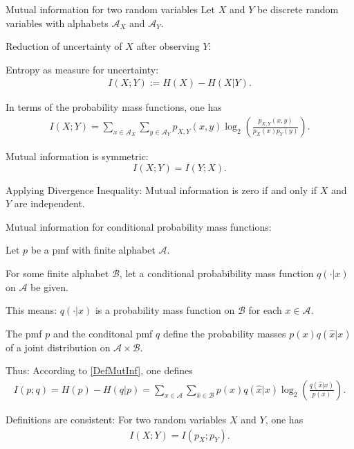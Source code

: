 \begin{frame}{Mutual information for two random variables}
Let $X$ and $Y$ be discrete random variables with alphabets $\mathcal{A}_X$ and $\mathcal{A}_Y$.

\bit
\item Reduction of uncertainty of $X$ after observing $Y$: 
\item[\iarrow] Entropy as measure for uncertainty: 
\begin{align}\label{DefMutInf}
I(X;Y):=H(X)-H(X|Y). 
\end{align}  
\item In terms of the probability mass functions, one has 
\begin{align*}
I(X;Y)=\sum_{x\in\mathcal{A}_X}\sum_{y\in\mathcal{A}_Y}p_{X,Y}(x,y)\log_2\left(\frac{p_{X,Y}(x,y)}{p_{X}(x)p_{Y}(y)}\right). 
\end{align*}
\item[\iarrow] Mutual information is symmetric:
\[
I(X;Y)=I(Y;X).
\]
\item[\iarrow]  Applying Divergence Inequality: Mutual information is zero if and only if $X$ and $Y$ are independent. 
\eit
\end{frame}
\begin{frame}{Mutual information for conditional probability mass functions:} 
\bit
\item Let $p$ be a pmf with finite alphabet $\mathcal{A}$. 
\item For some finite alphabet $\mathcal{B}$, let a conditional probabibility mass function $q(\cdot|x)$ on $\mathcal{A}$ be given. 
\item This means: $q(\cdot|x)$ is a probability mass function on $\mathcal{B}$ for 
each $x\in\mathcal{A}$. 
\item The pmf $p$ and the conditonal pmf $q$ define the probability masses $p(x)q(\hat{x}|x)$ of a joint distribution on $\mathcal{A}\times\mathcal{B}$.
\item[\iarrow] Thus: According to \eqref{DefMutInf}, one defines
\begin{align*}
I(p;q)=H(p)-H(q|p)=\sum_{x\in\mathcal{A}}\sum_{\hat{x}\in\mathcal{B}}p(x)q(\hat{x}|x)\log_2\left(\frac{q(\hat{x}|x)}{p(x)}\right).
\end{align*}
\item Definitions are consistent: For two random variables $X$ and $Y$, one has
\begin{align*}
I(X;Y)=I(p_X;p_Y). 
\end{align*}
\eit 
\end{frame}

